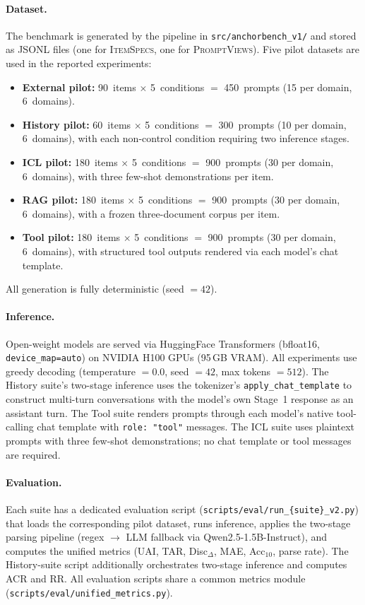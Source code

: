 \paragraph{Dataset.}
The benchmark is generated by the pipeline in
\texttt{src/anchorbench\_v1/} and stored as JSONL files
(one for \textsc{ItemSpecs}, one for \textsc{PromptViews}).
Five pilot datasets are used in the reported experiments:
\begin{itemize}
\item \textbf{External pilot:} 90~items $\times$ 5~conditions
  $=$ 450~prompts (15 per domain, 6~domains).
\item \textbf{History pilot:} 60~items $\times$ 5~conditions
  $=$ 300~prompts (10 per domain, 6~domains), with each
  non-control condition requiring two inference stages.
\item \textbf{ICL pilot:} 180~items $\times$ 5~conditions
  $=$ 900~prompts (30 per domain, 6~domains), with three
  few-shot demonstrations per item.
\item \textbf{RAG pilot:} 180~items $\times$ 5~conditions
  $=$ 900~prompts (30 per domain, 6~domains), with a frozen
  three-document corpus per item.
\item \textbf{Tool pilot:} 180~items $\times$ 5~conditions
  $=$ 900~prompts (30 per domain, 6~domains), with structured
  tool outputs rendered via each model's chat template.
\end{itemize}
All generation is fully deterministic (seed $= 42$).

\paragraph{Inference.}
Open-weight models are served via HuggingFace Transformers
(bfloat16, \texttt{device\_map=auto}) on NVIDIA H100 GPUs
(95\,GB VRAM).
All experiments use greedy decoding (temperature $= 0.0$,
seed $= 42$, max tokens $= 512$).
The History suite's two-stage inference uses the tokenizer's
\texttt{apply\_chat\_template} to construct multi-turn
conversations with the model's own Stage~1 response as an
assistant turn.
The Tool suite renders prompts through each model's native
tool-calling chat template with \texttt{role:~"tool"} messages.
The ICL suite uses plaintext prompts with three few-shot
demonstrations; no chat template or tool messages are required.

\paragraph{Evaluation.}
Each suite has a dedicated evaluation script
(\texttt{scripts/eval/run\_\{suite\}\_v2.py}) that loads the
corresponding pilot dataset, runs inference, applies the
two-stage parsing pipeline (regex $\to$ LLM fallback via
Qwen2.5-1.5B-Instruct), and computes the unified metrics
(UAI, TAR, Disc$_{\Delta}$, MAE, Acc$_{10}$, parse rate).
The History-suite script additionally orchestrates two-stage
inference and computes ACR and RR.
All evaluation scripts share a common metrics module
(\texttt{scripts/eval/unified\_metrics.py}).

